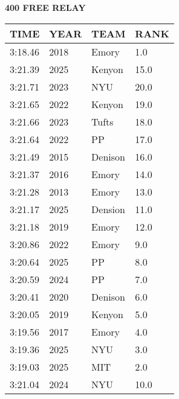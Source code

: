 \begin{table}[H]
\centering
\begin{minipage}[t]{0.6\textwidth}
\centering
\textbf{400 FREE RELAY}\\[0.1cm]
\begin{tabular}{@{}p{1.8cm}p{1.2cm}p{1.4cm}p{0.8cm}@{}}
\hline
    \textbf{TIME} & \textbf{YEAR} & \textbf{TEAM} & \textbf{RANK} \\
\hline
    3:18.46 & 2018 & Emory & 1.0 \\
    3:21.39 & 2025 & Kenyon & 15.0 \\
    3:21.71 & 2023 & NYU & 20.0 \\
    3:21.65 & 2022 & Kenyon & 19.0 \\
    3:21.66 & 2023 & Tufts & 18.0 \\
    3:21.64 & 2022 & PP & 17.0 \\
    3:21.49 & 2015 & Denison & 16.0 \\
    3:21.37 & 2016 & Emory & 14.0 \\
    3:21.28 & 2013 & Emory & 13.0 \\
    3:21.17 & 2025 & Dension & 11.0 \\
    3:21.18 & 2019 & Emory & 12.0 \\
    3:20.86 & 2022 & Emory & 9.0 \\
    3:20.64 & 2025 & PP & 8.0 \\
    3:20.59 & 2024 & PP & 7.0 \\
    3:20.41 & 2020 & Denison & 6.0 \\
    3:20.05 & 2019 & Kenyon & 5.0 \\
    3:19.56 & 2017 & Emory & 4.0 \\
    3:19.36 & 2025 & NYU & 3.0 \\
    3:19.03 & 2025 & MIT & 2.0 \\
    3:21.04 & 2024 & NYU & 10.0 \\
\hline
\end{tabular}
\end{minipage}
\end{table}

